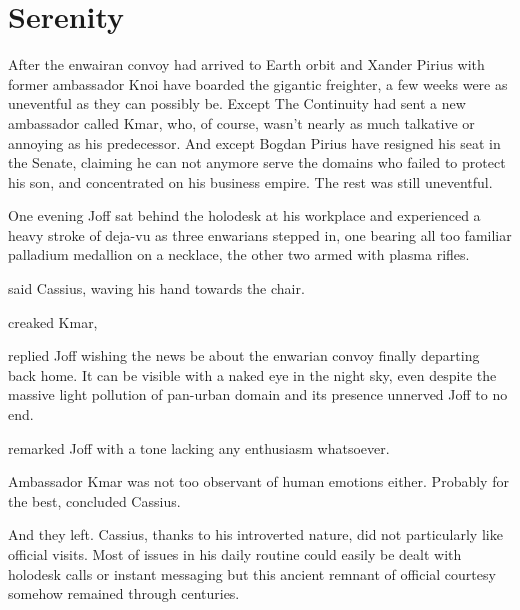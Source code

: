 \chapter{Serenity}

After the enwairan convoy had arrived to Earth orbit and Xander Pirius with former ambassador Knoi have boarded the gigantic freighter, a few weeks were as uneventful as they can possibly be. Except The Continuity had sent a new ambassador called Kmar, who, of course, wasn't nearly as much talkative or annoying as his predecessor. And except Bogdan Pirius have resigned his seat in the Senate, claiming he can not anymore serve the domains who failed to protect his son, and concentrated on his business empire. The rest was still uneventful.

One evening Joff sat behind the holodesk at his workplace and experienced a heavy stroke of deja-vu as three enwarians  stepped in, one bearing all too familiar palladium medallion on a necklace, the other two armed with plasma rifles.

 said Cassius, waving his hand towards the chair.

 creaked Kmar, 

 replied Joff wishing the news be about the enwarian convoy finally departing back home. It can be visible with a naked eye in the night sky, even despite the massive light pollution of pan-urban domain and its presence unnerved Joff to no end.


 remarked Joff with a tone lacking any enthusiasm whatsoever.


Ambassador Kmar was not too observant of human emotions either. Probably for the best, concluded Cassius.




And they left. Cassius, thanks to his introverted nature, did not particularly like official visits. Most of issues in his daily routine could easily be dealt with holodesk calls or instant messaging but this ancient remnant of official courtesy somehow remained through centuries.

